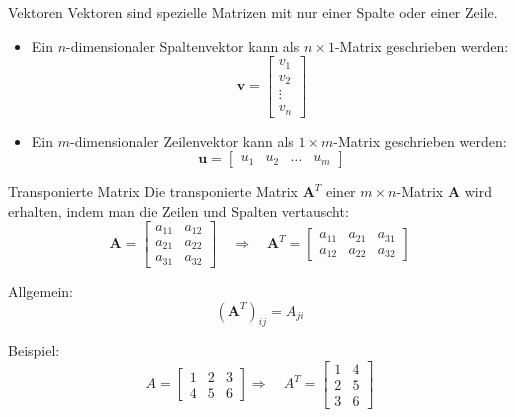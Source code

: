 \documentclass{beamer}
\begin{document}
\begin{frame}{Vektoren}
  Vektoren sind spezielle Matrizen mit nur einer Spalte oder einer Zeile.
  \begin{itemize}
  
    \item Ein \(n\)-dimensionaler Spaltenvektor kann als \(n \times 1\)-Matrix geschrieben werden:
      \[
        \mathbf{v} = \begin{bmatrix} v_1 \\ v_2 \\ \vdots \\ v_n \end{bmatrix}
      \]
    \item Ein \(m\)-dimensionaler Zeilenvektor kann als \(1 \times m\)-Matrix geschrieben werden:
      \[
        \mathbf{u} = \begin{bmatrix} u_1 & u_2 & \ldots & u_m \end{bmatrix}
      \]
  \end{itemize}
\end{frame}

\begin{frame}{Transponierte Matrix}
  Die transponierte Matrix \(\mathbf{A}^T\) einer \(m \times n\)-Matrix \(\mathbf{A}\) wird erhalten, indem man die Zeilen und Spalten vertauscht:
  \[
    \mathbf{A} = \begin{bmatrix} a_{11} & a_{12} \\ a_{21} & a_{22} \\ a_{31} & a_{32} \end{bmatrix} \quad
    \Rightarrow \quad
    \mathbf{A}^T = \begin{bmatrix} a_{11} & a_{21} & a_{31} \\ a_{12} & a_{22} & a_{32} \end{bmatrix}
  \]
  
  Allgemein:
  \[
    (\mathbf{A}^T)_{ij} = A_{ji}
  \]

  Beispiel:
  \[A= \begin{bmatrix}
    1 & 2 & 3\\
    4 & 5 & 6
  \end{bmatrix}
  \Rightarrow \quad
  A^T = \begin{bmatrix}
    1 & 4\\
    2 & 5\\
    3 & 6
  \end{bmatrix}
    \]
\end{frame}
\end{document}
